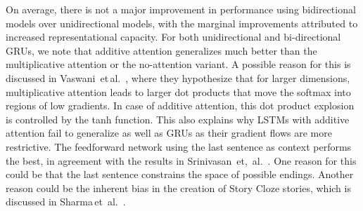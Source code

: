 \documentclass{article}
\begin{document}
On average, there is not a major improvement in performance using bidirectional models over unidirectional models, with the marginal improvements attributed to increased representational capacity. For both unidirectional and bi-directional GRUs, we note that additive attention generalizes much better than the multiplicative attention or the no-attention variant. A possible reason for this is discussed in Vaswani\, et\,al.\ \citep{AllYouNeed}, where they hypothesize that for larger dimensions, multiplicative attention leads to larger dot products that move the softmax into regions of low gradients. In case of additive attention, this dot product explosion is controlled by the tanh function. This also explains why LSTMs with additive attention fail to generalize as well as GRUs as their gradient flows are more restrictive. The feedforward network using the last sentence as context performs the best, in agreement with the results in Srinivasan\, et,\ al.\ \citep{Srinivasan2018ATest}. One reason for this could be that the last sentence constrains the space of possible endings. Another reason could be the inherent bias in the creation of Story Cloze stories, which is discussed in Sharma\,et\, al.\ \citep{sharma-etal-2018-tackling}. 
\end{document}
